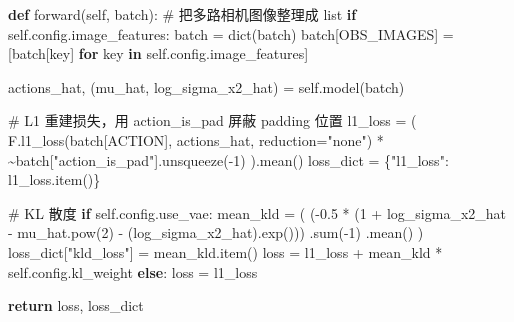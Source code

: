 \documentclass[
  chinese,
]{ctexart}
\newenvironment{Shaded}{\begin{snugshade}}{\end{snugshade}}
\newcommand{\BuiltInTok}[1]{\textcolor[rgb]{0.00,0.23,0.31}{#1}}
\newcommand{\CommentTok}[1]{\textcolor[rgb]{0.37,0.37,0.37}{#1}}
\newcommand{\ControlFlowTok}[1]{\textcolor[rgb]{0.00,0.23,0.31}{\textbf{#1}}}
\newcommand{\DecValTok}[1]{\textcolor[rgb]{0.68,0.00,0.00}{#1}}
\newcommand{\FloatTok}[1]{\textcolor[rgb]{0.68,0.00,0.00}{#1}}
\newcommand{\KeywordTok}[1]{\textcolor[rgb]{0.00,0.23,0.31}{\textbf{#1}}}
\newcommand{\NormalTok}[1]{\textcolor[rgb]{0.00,0.23,0.31}{#1}}
\newcommand{\OperatorTok}[1]{\textcolor[rgb]{0.37,0.37,0.37}{#1}}
\newcommand{\StringTok}[1]{\textcolor[rgb]{0.13,0.47,0.30}{#1}}
\newcommand{\VariableTok}[1]{\textcolor[rgb]{0.07,0.07,0.07}{#1}}
\begin{document}
\begin{Shaded}
\begin{Highlighting}[]
\KeywordTok{def}\NormalTok{ forward(}\VariableTok{self}\NormalTok{, batch):}
    \CommentTok{\# 把多路相机图像整理成 list}
    \ControlFlowTok{if} \VariableTok{self}\NormalTok{.config.image\_features:}
\NormalTok{        batch }\OperatorTok{=} \BuiltInTok{dict}\NormalTok{(batch)}
\NormalTok{        batch[OBS\_IMAGES] }\OperatorTok{=}\NormalTok{ [batch[key] }\ControlFlowTok{for}\NormalTok{ key }\KeywordTok{in} \VariableTok{self}\NormalTok{.config.image\_features]}

\NormalTok{    actions\_hat, (mu\_hat, log\_sigma\_x2\_hat) }\OperatorTok{=} \VariableTok{self}\NormalTok{.model(batch)}

    \CommentTok{\# L1 重建损失，用 action\_is\_pad 屏蔽 padding 位置}
\NormalTok{    l1\_loss }\OperatorTok{=}\NormalTok{ (}
\NormalTok{        F.l1\_loss(batch[ACTION], actions\_hat, reduction}\OperatorTok{=}\StringTok{"none"}\NormalTok{)}
        \OperatorTok{*} \OperatorTok{\textasciitilde{}}\NormalTok{batch[}\StringTok{"action\_is\_pad"}\NormalTok{].unsqueeze(}\OperatorTok{{-}}\DecValTok{1}\NormalTok{)}
\NormalTok{    ).mean()}
\NormalTok{    loss\_dict }\OperatorTok{=}\NormalTok{ \{}\StringTok{"l1\_loss"}\NormalTok{: l1\_loss.item()\}}

    \CommentTok{\# KL 散度}
    \ControlFlowTok{if} \VariableTok{self}\NormalTok{.config.use\_vae:}
\NormalTok{        mean\_kld }\OperatorTok{=}\NormalTok{ (}
\NormalTok{            (}\OperatorTok{{-}}\FloatTok{0.5} \OperatorTok{*}\NormalTok{ (}\DecValTok{1} \OperatorTok{+}\NormalTok{ log\_sigma\_x2\_hat }\OperatorTok{{-}}\NormalTok{ mu\_hat.}\BuiltInTok{pow}\NormalTok{(}\DecValTok{2}\NormalTok{) }\OperatorTok{{-}}\NormalTok{ (log\_sigma\_x2\_hat).exp()))}
\NormalTok{            .}\BuiltInTok{sum}\NormalTok{(}\OperatorTok{{-}}\DecValTok{1}\NormalTok{)}
\NormalTok{            .mean()}
\NormalTok{        )}
\NormalTok{        loss\_dict[}\StringTok{"kld\_loss"}\NormalTok{] }\OperatorTok{=}\NormalTok{ mean\_kld.item()}
\NormalTok{        loss }\OperatorTok{=}\NormalTok{ l1\_loss }\OperatorTok{+}\NormalTok{ mean\_kld }\OperatorTok{*} \VariableTok{self}\NormalTok{.config.kl\_weight}
    \ControlFlowTok{else}\NormalTok{:}
\NormalTok{        loss }\OperatorTok{=}\NormalTok{ l1\_loss}

    \ControlFlowTok{return}\NormalTok{ loss, loss\_dict}
\end{Highlighting}
\end{Shaded}
\end{document}
